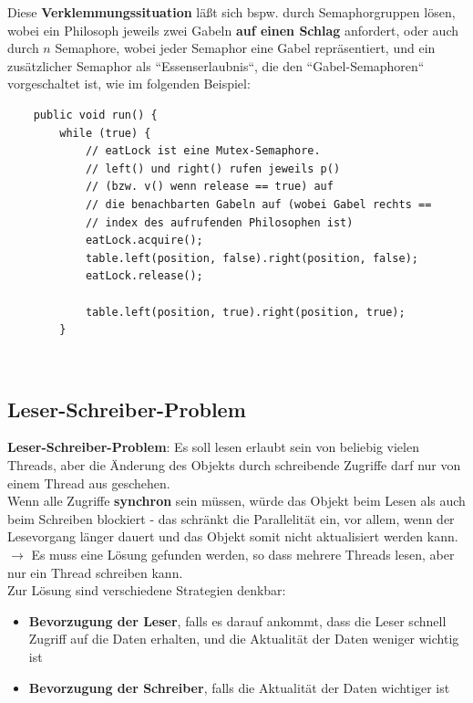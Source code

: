 \noindent
Diese \textbf{Verklemmungssituation} läßt sich bspw. durch Semaphorgruppen lösen, wobei ein Philosoph jeweils zwei Gabeln \textbf{auf einen Schlag} anfordert, oder auch durch $n$ Semaphore, wobei jeder Semaphor eine Gabel repräsentiert, und ein zusätzlicher Semaphor als ``Essenserlaubnis``, die den ``Gabel-Semaphoren`` vorgeschaltet ist, wie im folgenden Beispiel:

\begin{verbatim}
    public void run() {
        while (true) {
            // eatLock ist eine Mutex-Semaphore.
            // left() und right() rufen jeweils p()
            // (bzw. v() wenn release == true) auf
            // die benachbarten Gabeln auf (wobei Gabel rechts ==
            // index des aufrufenden Philosophen ist)
            eatLock.acquire();
            table.left(position, false).right(position, false);
            eatLock.release();

            table.left(position, true).right(position, true);
        }
\end{verbatim}\\



\subsection{Leser-Schreiber-Problem}\label{subsec:readerwriterproblem}

\textbf{Leser-Schreiber-Problem}: Es soll lesen erlaubt sein von beliebig vielen Threads, aber die Änderung des Objekts durch schreibende Zugriffe darf nur von einem Thread aus geschehen.\\

\noindent
Wenn alle Zugriffe \textbf{synchron} sein müssen, würde das Objekt beim Lesen als auch beim Schreiben blockiert - das schränkt die Parallelität ein, vor allem, wenn der Lesevorgang länger dauert und das Objekt somit nicht aktualisiert werden kann.\\

\noindent
$\rightarrow$ Es muss eine Lösung gefunden werden, so dass mehrere Threads lesen, aber nur ein Thread schreiben kann.\\

\noindent
Zur Lösung sind verschiedene Strategien denkbar:

\begin{itemize}
    \item \textbf{Bevorzugung der Leser}, falls es darauf ankommt, dass die Leser schnell Zugriff auf die Daten erhalten, und die Aktualität der Daten weniger wichtig ist
    \item \textbf{Bevorzugung der Schreiber}, falls die Aktualität der Daten wichtiger ist
\end{itemize}\\

